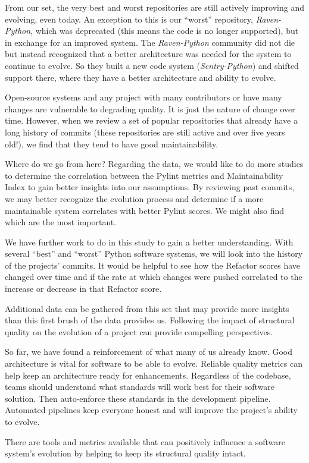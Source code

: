 From our set, the very best and worst repositories are still actively improving and evolving, even today. An exception to this is our ``worst'' repository, \emph{Raven-Python}, which was deprecated (this means the code is no longer supported), but in exchange for an improved system. The \emph{Raven-Python} community did not die but instead recognized that a better architecture was needed for the system to continue to evolve. So they built a new code system (\emph{Sentry-Python}) and shifted support there, where they have a better architecture and ability to evolve.

Open-source systems and any project with many contributors or have many changes are vulnerable to degrading quality. It is just the nature of change over time. However, when we review a set of popular repositories that already have a long history of commits (these repositories are still active and over five years old!), we find that they tend to have good maintainability.

Where do we go from here? Regarding the data, we would like to do more studies to determine the correlation between the Pylint metrics and Maintainability Index to gain better insights into our assumptions. By reviewing past commits, we may better recognize the evolution process and determine if a more maintainable system correlates with better Pylint scores. We might also find which are the most important.

We have further work to do in this study to gain a better understanding. With several ``best'' and ``worst'' Python software systems, we will look into the history of the projects' commits. It would be helpful to see how the Refactor scores have changed over time and if the rate at which changes were pushed correlated to the increase or decrease in that Refactor score.

Additional data can be gathered from this set that may provide more insights than this first brush of the data provides us. Following the impact of structural quality on the evolution of a project can provide compelling perspectives.

So far, we have found a reinforcement of what many of us already know. Good architecture is vital for software to be able to evolve. Reliable quality metrics can help keep an architecture ready for enhancements. Regardless of the codebase, teams should understand what standards will work best for their software solution. Then auto-enforce these standards in the development pipeline. Automated pipelines keep everyone honest and will improve the project's ability to evolve.

There are tools and metrics available that can positively influence a software system's evolution by helping to keep its structural quality intact.
